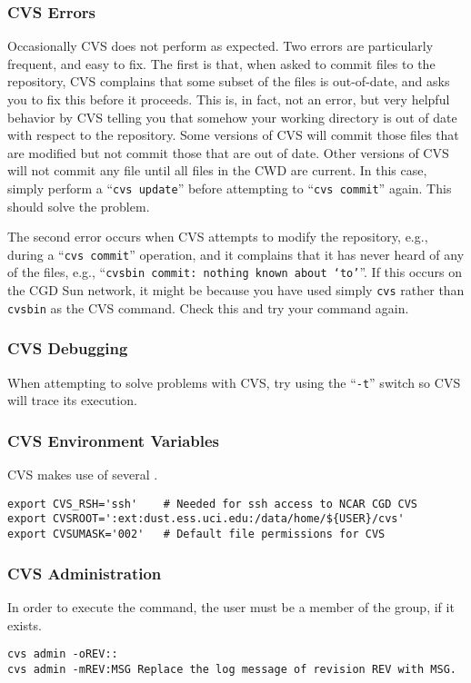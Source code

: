 \documentclass[12pt,twoside]{article}
\begin{document}
\subsubsection{CVS Errors}
Occasionally CVS does not perform as expected.
Two errors are particularly frequent, and easy to fix.
The first is that, when asked to commit files to the repository, CVS
complains that some subset of the files is out-of-date, and asks you
to fix this before it proceeds. 
This is, in fact, not an error, but very helpful behavior by CVS
telling you that somehow your working directory is out of date with
respect to the repository. 
Some versions of CVS will commit those files that are modified but not
commit those that are out of date.
Other versions of CVS will not commit any file until all files in the
CWD are current.
In this case, simply perform a ``\texttt{cvs update}'' before
attempting to ``\texttt{cvs commit}'' again.
This should solve the problem.

The second error occurs when CVS attempts to modify the repository,
e.g., during a ``\texttt{cvs commit}'' operation, and it complains
that it has never heard of any of the files, e.g., ``\texttt{cvsbin
commit: nothing known about `to'}''. 
If this occurs on the CGD Sun network, it might be because you have
used simply \verb'cvs' rather than \verb'cvsbin' as the CVS command.
Check this and try your command again.

\subsubsection{CVS Debugging}
When attempting to solve problems with CVS, try using the
``\texttt{-t}'' switch so CVS will trace its execution.

\subsubsection{CVS Environment Variables}
CVS makes use of several .
\begin{verbatim}
export CVS_RSH='ssh'    # Needed for ssh access to NCAR CGD CVS
export CVSROOT=':ext:dust.ess.uci.edu:/data/home/${USER}/cvs'
export CVSUMASK='002'   # Default file permissions for CVS
\end{verbatim}

\subsubsection{CVS Administration}
In order to execute the  command, the user must be a
member of the  group, if it exists.
\begin{verbatim}
cvs admin -oREV::
cvs admin -mREV:MSG Replace the log message of revision REV with MSG.
\end{verbatim}
\end{document}
